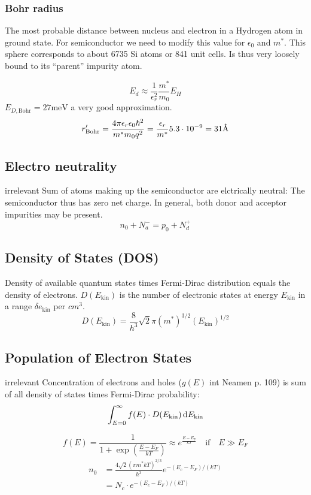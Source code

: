 \documentclass[a4paper, fontsize=8pt, landscape, DIV=1]{scrartcl}
\newcommand{\makeultracompact}{irrelevant}
\begin{document}
\begin{multicols*}{4}
    \subsubsection{Bohr radius}
    The most probable distance between nucleus and electron in a Hydrogen atom in ground state.
    For semiconductor we need to modify this value for $\epsilon_0$ and $m^*$.
    This sphere corresponds to about 6735  Si atoms or 841 unit cells. Is thus very loosely bound to its ``parent'' impurity atom.
  \fi

  \[E_d\approx \frac{1}{\epsilon_r^2}\frac{m^*}{m_0}E_H\]
  $E_{D,\text{Bohr}} = 27\text{meV}$ a very good approximation.
  \[r'_{\text{Bohr}}=\frac{4\pi\epsilon_r\epsilon_0\hbar^2}{m^*m_0q^2} = \frac{\epsilon_r}{m^*}5.3\cdot10^{-9}=31\textup{\AA}\]

  \subsection{Electro neutrality}
  \ifdefined\makeultracompact\else
    Sum of atoms making up the semiconductor are elctrically neutral: The semiconductor thus has zero net charge.
    In general, both donor and acceptor impurities may be present.
  \fi
  \[n_0 + N_a^- = p_0 + N_d^+\]

  \subsection{Density of States (DOS)}
  Density of available quantum states times Fermi-Dirac distribution equals the density of electrons. $D(E_\text{kin})$ is the number of electronic states at energy $E_\text{kin}$ in a range $\delta e_\text{kin}$ per $cm^3$.
  \[D(E_\text{kin}) = \frac{8}{h^3}\sqrt{2}\pi(m^*)^{3/2}(E_\text{kin})^{1/2}\]

  \subsection{Population of Electron States}

  \ifdefined\makeultracompact\else
    Concentration of electrons and holes ($g(E)$ int Neamen p. 109) is sum of all density of states times Fermi-Dirac probability:
    \[\int_{E=0}^\infty f(E) \cdot D(E_\text{kin})\,\mathrm{d} E_\text{kin}\]
  \fi

  \[f(E) = \frac{1}{1+\exp\left(\frac{E-E_F}{kT}\right)} \approx e^{\frac{E-E_F}{kT}} \quad\text{if} \quad E \gg E_F\]
  \begin{align*}
    n_0 &= \frac{4\sqrt{2}(\pi m^* kT)^{2/3}}{h^3}e^{-(E_c-E_F)/(kT)} \\
        &= N_c \cdot e^{-(E_c-E_F)/(kT)}
  \end{align*}


\end{multicols*}
\end{document}
